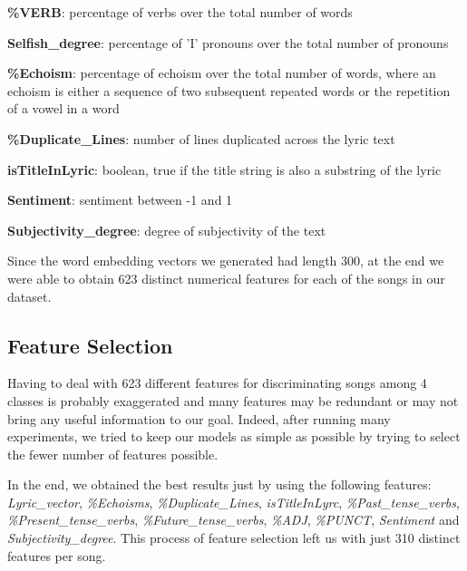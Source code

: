 \begin{description}
\item \textbf{\%VERB}: percentage of verbs over the total number of words
\item \textbf{Selfish\_degree}: percentage of 'I' pronouns over the total number of pronouns
\item \textbf{\%Echoism}: percentage of echoism over the total number of words, where an echoism is either a sequence of two subsequent repeated words or the repetition of a vowel in a word
\item \textbf{\%Duplicate\_Lines}: number of lines duplicated across the lyric text
\item \textbf{isTitleInLyric}: boolean, true if the title string is also a substring of the lyric
\item \textbf{Sentiment}: sentiment between -1 and 1
\item \textbf{Subjectivity\_degree}: degree of subjectivity of the text
\end{description}

Since the word embedding vectors we generated had length 300, at the end we were able to obtain 623 distinct numerical features for each of the songs in our dataset.

\subsection{Feature Selection}

Having to deal with 623 different features for discriminating songs among 4 classes is probably exaggerated and many features may be redundant or may not bring any useful information to our goal. Indeed, after running many experiments, we tried to keep our models as simple as possible by trying to select the fewer number of features possible.

In the end, we obtained the best results just by using the following features: \textit{Lyric\_vector}, \textit{\%Echoisms}, \textit{\%Duplicate\_Lines}, \textit{isTitleInLyrc}, \textit{\%Past\_tense\_verbs}, \textit{\%Present\_tense\_verbs}, \textit{\%Future\_tense\_verbs}, \textit{\%ADJ}, \textit{\%PUNCT}, \textit{Sentiment} and \textit{Subjectivity\_degree}. This process of feature selection left us with just 310 distinct features per song.

